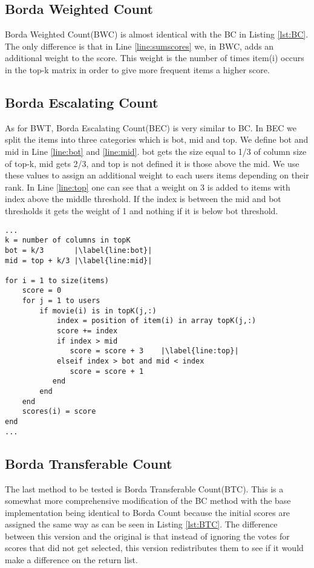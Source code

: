 \subsection{Borda Weighted Count}
Borda Weighted Count(BWC) is almost identical with the BC in Listing \ref{lst:BC}. The only difference is that in Line \ref{line:sumscores} we, in BWC, adds an additional weight to the score. This weight is the number of times item(i) occurs in the top-k matrix in order to give more frequent items a higher score.

\subsection{Borda Escalating Count}
As for BWT, Borda Escalating Count(BEC) is very similar to BC. In BEC we split the items into three categories which is bot, mid and top. We define bot and mid in Line \ref{line:bot} and \ref{line:mid}. bot gets the size equal to 1/3 of column size of top-k, mid gets 2/3, and top is not defined it is those above the mid. We use these values to assign an additional weight to each users items depending on their rank. In Line \ref{line:top} one can see that a weight on 3 is added to items with index above the middle threshold. If the index is between the mid and bot thresholds it gets the weight of 1 and nothing if it is below bot threshold.
\begin{lstlisting}[caption={Borda escalating count implementation},label=lst:BEC, firstnumber=7,escapechar=|]
...
k = number of columns in topK
bot = k/3 		|\label{line:bot}|
mid = top + k/3	|\label{line:mid}|

for i = 1 to size(items)
	score = 0
	for j = 1 to users
		if movie(i) is in topK(j,:)
			index = position of item(i) in array topK(j,:)
			score += index
			if index > mid			
               score = score + 3	|\label{line:top}|
           	elseif index > bot and mid < index
               score = score + 1
           end 
		end
	end
	scores(i) = score
end
...
\end{lstlisting}

\subsection{Borda Transferable Count} \label{sec:BTC}
The last method to be tested is Borda Transferable Count(BTC). This is a somewhat more comprehensive modification of the BC method with the base implementation being identical to Borda Count because the initial scores are assigned the same way as can be seen in Listing \ref{lst:BTC}. The difference between this version and the original is that instead of ignoring the votes for scores that did not get selected, this version redistributes them to see if it would make a difference on the return list.

